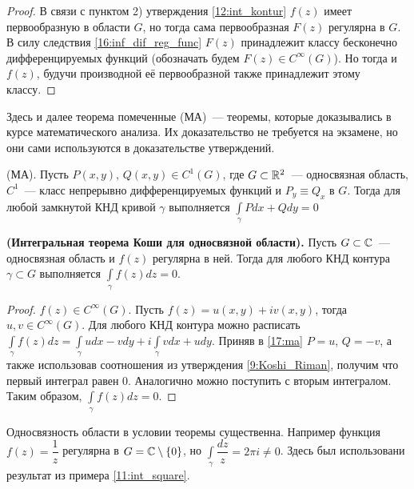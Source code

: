 \begin{proof}
    В связи с пунктом 2) утверждения \ref{12:int_kontur} \(f(z)\) имеет первообразную в области 
    \(G\), но тогда сама первообразная \(F(z)\) регулярна в \(G\). В силу следствия 
    \ref{16:inf_dif_reg_func} \(F(z)\) принадлежит классу бесконечно дифференцируемых функций
    (обозначать будем \(F(z) \in C^\infty(G)\)). Но тогда и \(f(z)\), будучи производной её
    первообразной также принадлежит этому классу.
\end{proof}



Здесь и далее теорема помеченные (МА)~--- теоремы, которые доказывались в курсе математического 
анализа. Их доказательство не требуется на экзамене, но они сами используются в доказательстве 
утверждений.

\begin{theorem}\label{17:ma}
    (МА). Пусть \(P(x, y), \, Q(x, y) \in C^1(G)\), где \(G \subset \mathbb{R}^2\)~--- односвязная область, 
    \(C^1\)~--- класс непрерывно дифференцируемых функций и \(P_y \equiv Q_x\) в \(G\). Тогда для
    любой замкнутой КНД кривой \(\gamma\) выполняется \(\int\limits_\gamma Pdx + Qdy = 0\)
\end{theorem}

\begin{theorem}
    \textbf{(Интегральная теорема Коши для односвязной области).} Пусть \(G \subset \mathbb{C}\)~---
    односвязная область и \(f(z)\) регулярна в ней. Тогда для любого КНД контура \(\gamma \subset
    G\) выполняется \(\int\limits_\gamma f(z) dz = 0\).
\end{theorem}

\begin{proof}
    \(f(z) \in C^\infty(G)\). Пусть \(f(z) = u(x, y) + i v(x, y)\), тогда \(u, v \in C^\infty(G)\).
    Для любого КНД контура можно расписать \(\int\limits_\gamma f(z) dz = \int\limits_\gamma 
    udx - vdy + i\int\limits_\gamma vdx+udy\). Приняв в \ref{17:ma} \(P = u\), \(Q = -v\), а также
    использовав соотношения из утверждения \ref{9:Koshi_Riman}, получим что первый интеграл равен 0.
    Аналогично можно поступить с вторым интегралом. Таким образом, \(\int\limits_\gamma f(z) dz 
    = 0\).
\end{proof}

\begin{example}
    Односвязность области в условии теоремы существенна. Например функция \(f(z) = \dfrac{1}{z}\)
    регулярна в \(G = \mathbb{C} \setminus \{0\}\), но \(\int\limits_\gamma \dfrac{dz}{z} = 2\pi i \ne 0\).
    Здесь был использовани результат из примера \ref{11:int_square}.
\end{example}